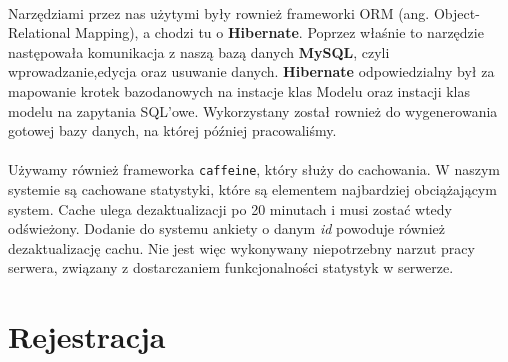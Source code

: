 \paragraph{}
Narzędziami przez nas użytymi były rownież frameworki ORM (ang. Object-Relational Mapping), a chodzi tu o \textbf{Hibernate}. Poprzez właśnie to narzędzie następowała komunikacja z naszą bazą danych \textbf{MySQL}, czyli wprowadzanie,edycja oraz usuwanie danych. \textbf{Hibernate} odpowiedzialny był za mapowanie krotek bazodanowych na instacje klas Modelu oraz instacji klas modelu na zapytania SQL'owe. Wykorzystany został rownież do wygenerowania gotowej bazy danych, na której później pracowaliśmy.

\paragraph{}
Używamy również frameworka \texttt{caffeine}, który służy do cachowania. W naszym systemie są cachowane statystyki, które są elementem najbardziej obciążającym system. Cache ulega dezaktualizacji po 20 minutach i musi zostać wtedy odświeżony. Dodanie do systemu ankiety o danym \textit{id} powoduje również dezaktualizację cachu. Nie jest więc wykonywany niepotrzebny narzut pracy serwera, związany z dostarczaniem funkcjonalności statystyk w serwerze.

\section{Rejestracja}
